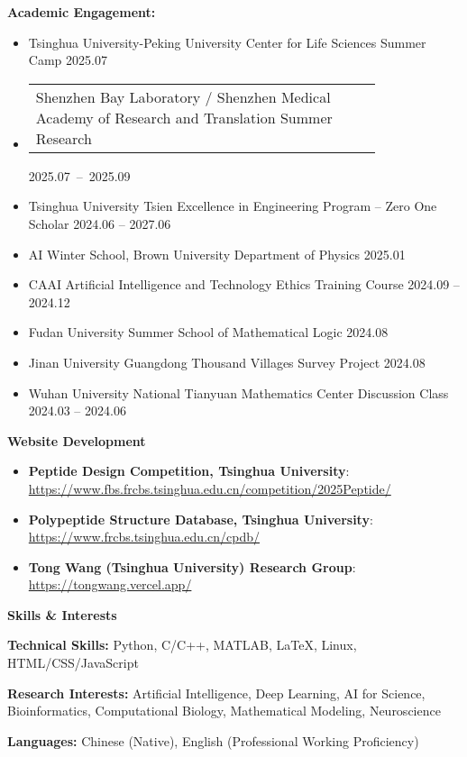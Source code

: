 \documentclass[11pt]{article}
\begin{document}
	\textbf{Academic Engagement:}
	\begin{itemize}[noitemsep, topsep=0pt, partopsep=0pt, parsep=0pt, leftmargin=*]
		\item Tsinghua University-Peking University Center for Life Sciences Summer Camp \hfill 2025.07
		\item \begin{tabular}[c]{@{}p{0.8\linewidth}@{}}Shenzhen Bay Laboratory / Shenzhen Medical Academy of Research and Translation Summer Research\end{tabular} \hfill \mbox{2025.07 -- 2025.09}
		\item Tsinghua University Tsien Excellence in Engineering Program -- Zero One Scholar \hfill 2024.06 -- 2027.06
		\item AI Winter School, Brown University Department of Physics \hfill 2025.01
		\item CAAI Artificial Intelligence and Technology Ethics Training Course \hfill 2024.09 -- 2024.12
		\item Fudan University Summer School of Mathematical Logic \hfill 2024.08
		\item Jinan University Guangdong Thousand Villages Survey Project \hfill 2024.08
		\item Wuhan University National Tianyuan Mathematics Center Discussion Class \hfill 2024.03 -- 2024.06
	\end{itemize}
	
	\vspace{12pt}

	\begin{center}
		\textbf{\large Website Development}
	\end{center}
	\begin{itemize}[noitemsep, topsep=0pt, partopsep=0pt, parsep=0pt, leftmargin=*]
		\item \textbf{Peptide Design Competition, Tsinghua University}: \href{https://www.fbs.frcbs.tsinghua.edu.cn/competition/2025Peptide/}{https://www.fbs.frcbs.tsinghua.edu.cn/competition/2025Peptide/}
		\item \textbf{Polypeptide Structure Database, Tsinghua University}: \href{https://www.frcbs.tsinghua.edu.cn/cpdb/}{https://www.frcbs.tsinghua.edu.cn/cpdb/}
		\item \textbf{Tong Wang (Tsinghua University) Research Group}: \href{https://tongwang.vercel.app/}{https://tongwang.vercel.app/}
	\end{itemize}

	\vspace{12pt}

	\begin{center}
		\textbf{\large Skills \& Interests}
	\end{center}
	\textbf{Technical Skills:} Python, C/C++, MATLAB, LaTeX, Linux, HTML/CSS/JavaScript
	
	\textbf{Research Interests:} Artificial Intelligence, Deep Learning, AI for Science, Bioinformatics, Computational Biology, Mathematical Modeling, Neuroscience
	
	\textbf{Languages:} Chinese (Native), English (Professional Working Proficiency)
	
\end{document}
